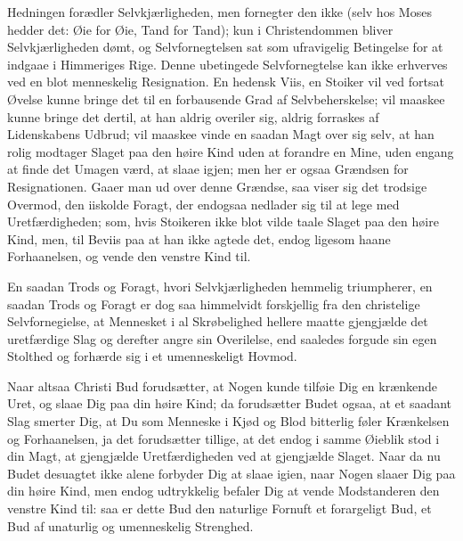 \documentclass[12pt,a4paper]{book}
\newcommand{\opage}[1]{\marginnote{\footnotesize\textit{[#1]}}}
\begin{document}
Hedningen forædler Selvkjærligheden, men fornegter den ikke (selv hos Moses
hedder det: Øie for Øie, Tand for Tand); kun i Christendommen bliver
Selvkjærligheden dømt, og Selvfornegtelsen sat som ufravigelig Betingelse for
at indgaae i Himmeriges Rige. Denne ubetingede Selvfornegtelse kan ikke
erhverves ved en blot menneskelig Resignation. En hedensk Viis, en Stoiker
vil ved fortsat Øvelse kunne bringe det til en forbausende Grad af
Selvbeherskelse; vil maaskee kunne bringe det dertil, at han aldrig overiler
sig, aldrig forraskes af Lidenskabens Udbrud; vil maaskee vinde en saadan
Magt over sig selv, at han rolig modtager Slaget paa den høire Kind uden at
forandre en Mine, uden engang at finde det Umagen værd, at slaae igjen; men
her er ogsaa Grændsen for Resignationen. Gaaer man ud over denne Grændse, saa
viser sig det trodsige Overmod, den iiskolde Foragt, der endogsaa nedlader
sig til at lege med Uretfærdigheden; som, hvis Stoikeren ikke blot vilde
taale Slaget paa den høire
\opage{72} Kind, men, til Beviis paa at han ikke agtede det, endog ligesom haane
Forhaanelsen, og vende den venstre Kind til.

En saadan Trods og Foragt, hvori Selvkjærligheden hemmelig triumpherer, en
saadan Trods og Foragt er dog saa himmelvidt forskjellig fra den christelige
Selvfornegielse, at Mennesket i al Skrøbelighed hellere maatte gjengjælde det
uretfærdige Slag og derefter angre sin Overilelse, end saaledes forgude sin
egen Stolthed og forhærde sig i et umenneskeligt Hovmod.

Naar altsaa Christi Bud forudsætter, at Nogen kunde tilføie Dig en krænkende
Uret, og slaae Dig paa din høire Kind; da forudsætter Budet ogsaa, at et
saadant Slag smerter Dig, at Du som Menneske i Kjød og Blod bitterlig føler
Krænkelsen og Forhaanelsen, ja det forudsætter tillige, at det endog i samme
Øieblik stod i din Magt, at gjengjælde Uretfærdigheden ved at gjengjælde
Slaget. Naar da nu Budet desuagtet ikke alene forbyder Dig at slaae igien,
naar Nogen slaaer Dig paa din høire Kind, men endog udtrykkelig befaler Dig
at vende Modstanderen den venstre Kind til: saa er dette Bud den naturlige
Fornuft et forargeligt Bud, et Bud af unaturlig og umenneskelig Strenghed.
\end{document}
